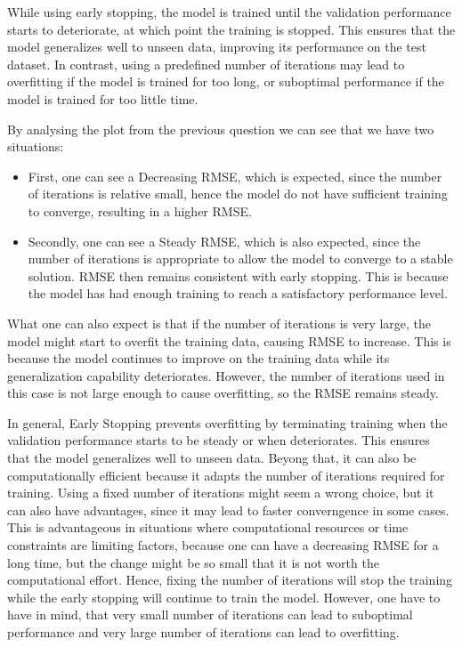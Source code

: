 \documentclass{article}
\begin{document}
While using early stopping, the model is trained until the validation performance starts to deteriorate, at which point the training is stopped. This ensures that the model generalizes well to unseen data, improving its performance on the test dataset. In contrast, using a predefined number of iterations may lead to overfitting if the model is trained for too long, or suboptimal performance if the model is trained for too little time.

By analysing the plot from the previous question we can see that we have two situations:
\begin{itemize}
    \item First, one can see a Decreasing RMSE, which is expected, since the number of iterations is relative small, hence the model do not have sufficient training to converge, resulting in a higher RMSE.
    \item Secondly, one can see a Steady RMSE, which is also expected, since the number of iterations is appropriate to allow the model to converge to a stable solution. RMSE then remains consistent with early stopping. This is because the model has had enough training to reach a satisfactory performance level.
\end{itemize}

What one can also expect is that if the number of iterations is very large, the model might start to overfit the training data, causing RMSE to increase. This is because the model continues to improve on the training data while its generalization capability deteriorates. However, the number of iterations used in this case is not large enough to cause overfitting, so the RMSE remains steady.

In general, Early Stopping prevents overfitting by terminating training when the validation performance starts to be steady or when deteriorates. This ensures that the model generalizes well to unseen data. Beyong that, it can also be computationally efficient because it adapts the number of iterations required for training.
Using a fixed number of iterations might seem a wrong choice, but it can also have advantages, since it may lead to faster converngence in some cases. This is advantageous in situations where computational resources or time constraints are limiting factors, because one can have a decreasing RMSE for a long time, but the change might be so small that it is not worth the computational effort. Hence, fixing the number of iterations will stop the training while the early stopping will continue to train the model.
However, one have to have in mind, that very small number of iterations can lead to suboptimal performance and very large number of iterations can lead to overfitting.
\end{document}
